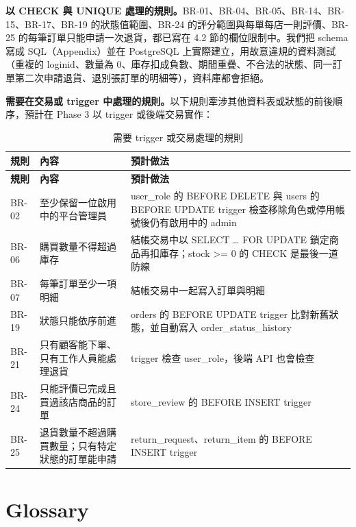 \documentclass[12pt,a4paper]{article}
\begin{document}
\textbf{以 CHECK 與 UNIQUE 處理的規則。}BR-01、BR-04、BR-05、BR-14、BR-15、BR-17、BR-19 的狀態值範圍、BR-24 的評分範圍與每單每店一則評價、BR-25 的每筆訂單只能申請一次退貨，都已寫在 4.2 節的欄位限制中。我們把 schema 寫成 SQL（Appendix）並在 PostgreSQL 上實際建立，用故意違規的資料測試（重複的 loginid、數量為 0、庫存扣成負數、期間重疊、不合法的狀態、同一訂單第二次申請退貨、退別張訂單的明細等），資料庫都會拒絕。

\textbf{需要在交易或 trigger 中處理的規則。}以下規則牽涉其他資料表或狀態的前後順序，預計在 Phase 3 以 trigger 或後端交易實作：

\begingroup\small
\begin{xltabular}{\linewidth}{|>{\centering\arraybackslash}p{1.6cm}|>{\raggedright\arraybackslash}X|>{\raggedright\arraybackslash}p{5.2cm}|}
\caption{需要 trigger 或交易處理的規則}\\
\hline{}\textbf{規則} & \textbf{內容} & \textbf{預計做法}\\\hline\endfirsthead
\hline{}\textbf{規則} & \textbf{內容} & \textbf{預計做法}\\\hline\endhead
BR-02 & 至少保留一位啟用中的平台管理員 & user\_role 的 BEFORE DELETE 與 users 的 BEFORE UPDATE trigger 檢查移除角色或停用帳號後仍有啟用中的 admin\\\hline
BR-06 & 購買數量不得超過庫存 & 結帳交易中以 SELECT … FOR UPDATE 鎖定商品再扣庫存；stock >= 0 的 CHECK 是最後一道防線\\\hline
BR-07 & 每筆訂單至少一項明細 & 結帳交易中一起寫入訂單與明細\\\hline
BR-19 & 狀態只能依序前進 & orders 的 BEFORE UPDATE trigger 比對新舊狀態，並自動寫入 order\_status\_history\\\hline
BR-21 & 只有顧客能下單、只有工作人員能處理退貨 & trigger 檢查 user\_role，後端 API 也會檢查\\\hline
BR-24 & 只能評價已完成且買過該店商品的訂單 & store\_review 的 BEFORE INSERT trigger\\\hline
BR-25 & 退貨數量不超過購買數量；只有特定狀態的訂單能申請 & return\_request、return\_item 的 BEFORE INSERT trigger\\\hline
\end{xltabular}
\endgroup


\clearpage
\section*{Glossary}
\end{document}
